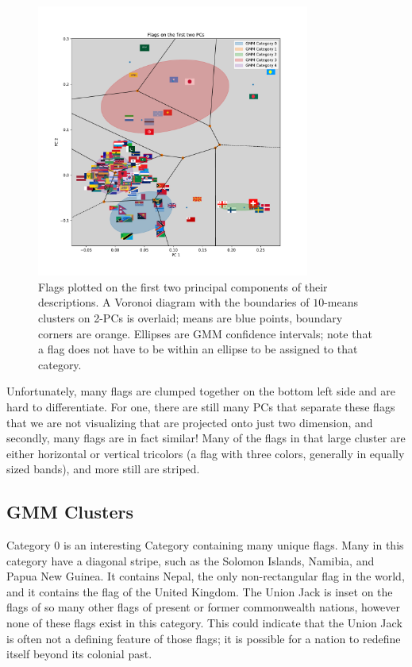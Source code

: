 \documentclass[11pt]{amsart}
\newcommand{\todo}[1]{\textcolor{red}{TODO: #1}}
\begin{document}
\begin{figure}[!ht]
    \centering
    \includegraphics[width=0.8\textwidth]{./res/flags-kmeans-gmm.pdf}
    \caption{Flags plotted on the first two principal components of their descriptions. A Voronoi diagram with the boundaries of \(10\)-means clusters on 2-PCs is overlaid; means are blue points, boundary corners are orange. Ellipses are GMM confidence intervals; note that a flag does not have to be within an ellipse to be assigned to that category.\label{fig:flag-pca}}
\end{figure}


Unfortunately, many flags are clumped together on the bottom left side and are
hard to differentiate. For one, there are still many PCs that separate these
flags that we are not visualizing that are projected onto just two dimension,
and secondly, many flags are in fact similar! Many of the flags in that large
cluster are either horizontal or vertical tricolors (a flag with three colors,
generally in equally sized bands), and more still are striped.

\subsection*{GMM Clusters}

Category 0 is an interesting Category containing many unique flags. Many in this
category have a diagonal stripe, such as the Solomon Islands, Namibia, and Papua
New Guinea. It contains Nepal, the only non-rectangular flag in the world, and
it contains the flag of the United Kingdom. The Union Jack is inset on the flags
of so many other flags of present or former commonwealth nations, however none
of these flags exist in this category. This could indicate that the Union Jack
is often not a defining feature of those flags; it is possible for a nation to
redefine itself beyond its colonial past.
\end{document}
